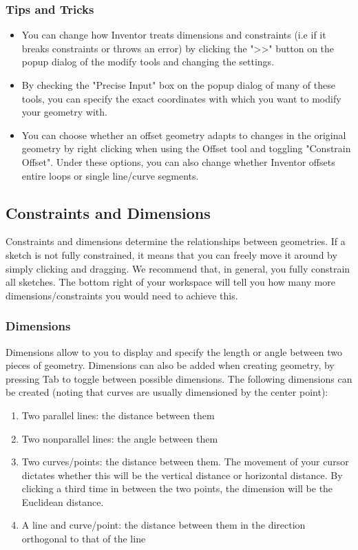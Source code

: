 \subsubsection{Tips and Tricks}
\begin{itemize}
\item You can change how Inventor treats dimensions and constraints (i.e if it breaks constraints or throws an error) by clicking the ">>" button on the popup dialog of the modify tools and changing the settings.
\item By checking the "Precise Input" box on the popup dialog of many of these tools, you can specify the exact coordinates with which you want to modify your geometry with.
\item You can choose whether an offset geometry adapts to changes in the original geometry by right clicking when using the Offset tool and toggling "Constrain Offset". Under these options, you can also change whether Inventor offsets entire loops or single line/curve segments.
\end{itemize}

\subsection{Constraints and Dimensions}
Constraints and dimensions determine the relationships between geometries. If a sketch is not fully constrained, it means that you can freely move it around by simply clicking and dragging. We recommend that, in general, you fully constrain all sketches. The bottom right of your workspace will tell you how many more dimensions/constraints you would need to achieve this.

\subsubsection{Dimensions}
Dimensions allow to you to display and specify the length or angle between two pieces of geometry. Dimensions can also be added when creating geometry, by pressing Tab to toggle between possible dimensions. The following dimensions can be created (noting that curves are usually dimensioned by the center point):

\begin{enumerate}
\item Two parallel lines: the distance between them
\item Two nonparallel lines: the angle between them
\item Two curves/points: the distance between them. The movement of your cursor dictates whether this will be the vertical distance or horizontal distance. By clicking a third time in between the two points, the dimension will be the Euclidean distance.
\item A line and curve/point: the distance between them in the direction orthogonal to that of the line
\end{enumerate}

